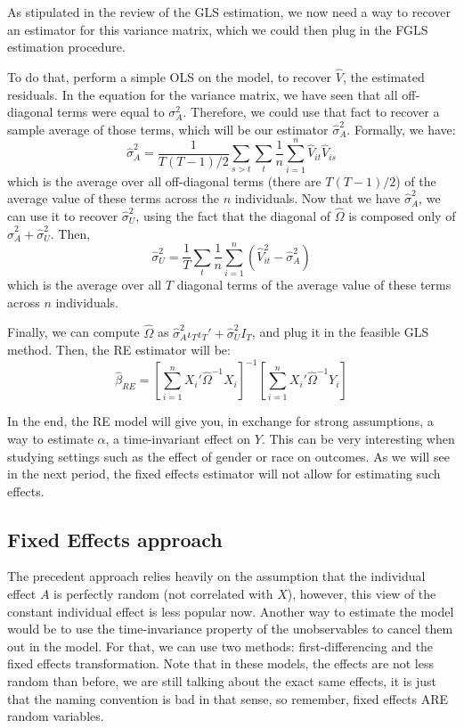 \documentclass[12pt]{report}
\begin{document}
As stipulated in the review of the GLS estimation, we now need a way to recover an estimator for this variance matrix, which we could then plug in the FGLS estimation procedure.

To do that, perform a simple OLS on the model, to recover $\hat V$, the estimated residuals. In the equation for the variance matrix, we have seen that all off-diagonal terms were equal to $\sigma_A^2$. Therefore, we could use that fact to recover a sample average of those terms, which will be our estimator $\hat\sigma_A^2$. Formally, we have: $$ \hat\sigma_A^2 = \frac{1}{T(T-1)/2}\sum_{s>t}\sum_{t}\frac{1}{n}\sum_{i=1}^{n} \hat V_{it}\hat V_{is} $$ which is the average over all off-diagonal terms (there are $T(T-1)/2$) of the average value of these terms across the $n$ individuals. Now that we have $\hat\sigma_A^2$, we can use it to recover $\hat\sigma_U^2$, using the fact that the diagonal of $\hat\Omega$ is composed only of $\hat\sigma_A^2 + \hat\sigma_U^2$. Then,$$ \hat\sigma_U^2 = \frac{1}{T}\sum_{t}\frac{1}{n}\sum_{i=1}^{n} \left(\hat V_{it}^2 - \hat\sigma_A^2\right) $$ which is the average over all $T$ diagonal terms of the average value of these terms across $n$ individuals.

Finally, we can compute $\hat\Omega$ as $\hat\sigma_A^2 \iota_T\iota_T' + \hat\sigma_U^2I_T$, and plug it in the feasible GLS method. Then, the RE estimator will be: $$\hat\beta_{RE} = \left[\sum_{i=1}^n X_i'\hat\Omega^{-1}X_i\right]^{-1}\left[\sum_{i=1}^n X_i'\hat\Omega^{-1}Y_i\right] $$

In the end, the RE model will give you, in exchange for strong assumptions, a way to estimate $\alpha$, a time-invariant effect on $Y$. This can be very interesting when studying settings such as the effect of gender or race on outcomes. As we will see in the next period, the fixed effects estimator will not allow for estimating such effects.
 
\subsection{Fixed Effects approach}

The precedent approach relies heavily on the assumption that the individual effect $A$ is perfectly random (not correlated with $X$), however, this view of the constant individual effect is less popular now. Another way to estimate the model would be to use the time-invariance property of the unobservables to cancel them out in the model. For that, we can use two methods: first-differencing and the fixed effects transformation. Note that in these models, the effects are not less random than before, we are still talking about the exact same effects, it is just that the naming convention is bad in that sense, so remember, fixed effects ARE random variables.
\end{document}
